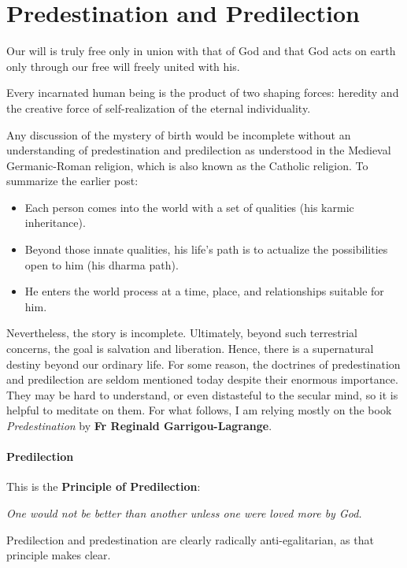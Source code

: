 \section{Predestination and Predilection}

\begin{quotex}
Our will is truly free only in union with that of God and that God acts on earth only through our free will freely united with his. 

Every incarnated human being is the product of two shaping forces: heredity and the creative force of self-realization of the eternal individuality. 

\end{quotex}
Any discussion of the mystery of birth would be incomplete without an understanding of predestination and predilection as understood in the Medieval Germanic-Roman religion, which is also known as the Catholic religion. To summarize the earlier post:

\begin{itemize}
\item Each person comes into the world with a set of qualities (his karmic inheritance). 
\item Beyond those innate qualities, his life's path is to actualize the possibilities open to him (his dharma path). 
\item He enters the world process at a time, place, and relationships suitable for him. 
\end{itemize}
Nevertheless, the story is incomplete. Ultimately, beyond such terrestrial concerns, the goal is salvation and liberation. Hence, there is a supernatural destiny beyond our ordinary life. For some reason, the doctrines of predestination and predilection are seldom mentioned today despite their enormous importance. They may be hard to understand, or even distasteful to the secular mind, so it is helpful to meditate on them. For what follows, I am relying mostly on the book \emph{Predestination} by \textbf{Fr Reginald Garrigou-Lagrange}.

\paragraph{Predilection}
This is the \textbf{Principle of Predilection}:

\emph{One would not be better than another unless one were loved more by God. }

Predilection and predestination are clearly radically anti-egalitarian, as that principle makes clear.


